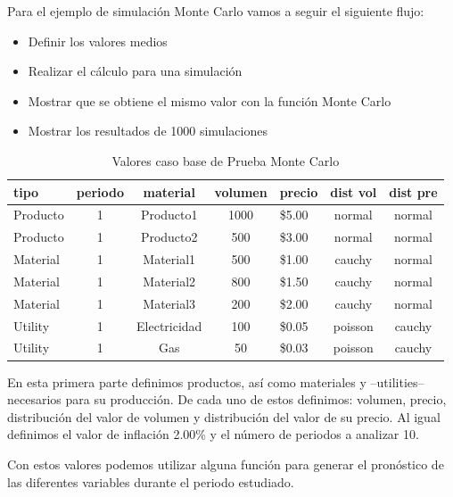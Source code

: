 \documentclass[
]{book}
\providecommand{\tightlist}{%
  \setlength{\itemsep}{0pt}\setlength{\parskip}{0pt}}
\begin{document}
Para el ejemplo de simulación Monte Carlo vamos a seguir el siguiente
flujo:

\begin{itemize}
\tightlist
\item
  Definir los valores medios
\item
  Realizar el cálculo para una simulación
\item
  Mostrar que se obtiene el mismo valor con la función Monte Carlo
\item
  Mostrar los resultados de 1000 simulaciones
\end{itemize}

\begin{table}

\caption{\label{tab:tabMonteTest1}Valores caso base de Prueba Monte Carlo}
\centering
\begin{tabular}[t]{l|c|c|c|l|c|c}
\hline
tipo & periodo & material & volumen & precio & dist vol & dist pre\\
\hline
Producto & 1 & Producto1 & 1000 & \$5.00 & normal & normal\\
\hline
Producto & 1 & Producto2 & 500 & \$3.00 & normal & normal\\
\hline
Material & 1 & Material1 & 500 & \$1.00 & cauchy & normal\\
\hline
Material & 1 & Material2 & 800 & \$1.50 & cauchy & normal\\
\hline
Material & 1 & Material3 & 200 & \$2.00 & cauchy & normal\\
\hline
Utility & 1 & Electricidad & 100 & \$0.05 & poisson & cauchy\\
\hline
Utility & 1 & Gas & 50 & \$0.03 & poisson & cauchy\\
\hline
\end{tabular}
\end{table}

En esta primera parte definimos productos, así como materiales y
--utilities-- necesarios para su producción. De cada uno de estos
definimos: volumen, precio, distribución del valor de volumen y
distribución del valor de su precio. Al igual definimos el valor de
inflación 2.00\% y el número de periodos a analizar
10.

Con estos valores podemos utilizar alguna función para generar el
pronóstico de las diferentes variables durante el periodo estudiado.
\end{document}

